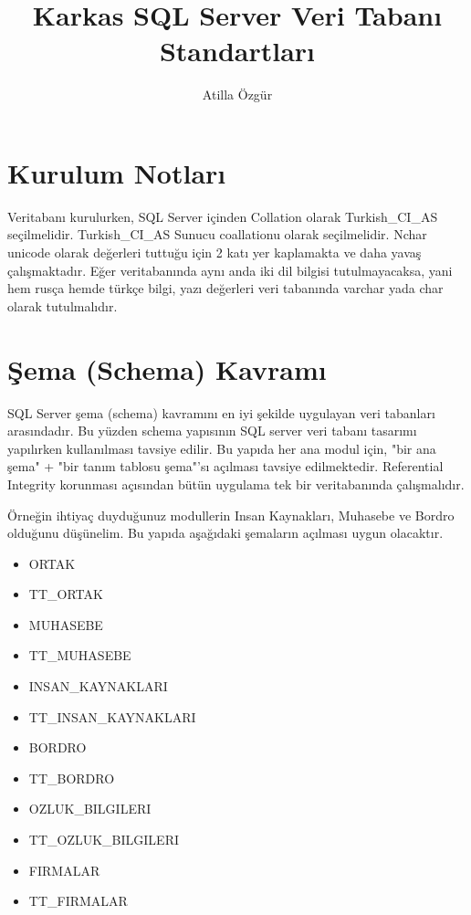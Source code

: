 \documentclass[10pt,a4paper,draft]{article}
\begin{document}
\author{Atilla Özgür}
\title{Karkas SQL Server Veri Tabanı Standartları}

\maketitle

\section{Kurulum Notları}
Veritabanı kurulurken, SQL Server içinden Collation olarak 
Turkish\_CI\_AS seçilmelidir. 
Turkish\_CI\_AS Sunucu coallationu olarak seçilmelidir. 
Nchar unicode olarak değerleri tuttuğu için 2 katı yer kaplamakta 
ve daha yavaş çalışmaktadır. 
Eğer veritabanında aynı anda iki dil bilgisi tutulmayacaksa, 
yani hem rusça hemde türkçe bilgi,
yazı değerleri veri tabanında  varchar yada char olarak tutulmalıdır.


\section{Şema (Schema) Kavramı}


SQL Server şema (schema) kavramını en iyi şekilde uygulayan veri tabanları arasındadır.
Bu yüzden schema yapısının SQL server veri tabanı tasarımı yapılırken kullanılması tavsiye edilir.
Bu yapıda her ana modul için, "bir ana şema" + "bir tanım tablosu şema"'sı açılması tavsiye edilmektedir.
Referential  Integrity korunması açısından bütün uygulama tek bir veritabanında çalışmalıdır.

Örneğin ihtiyaç duyduğunuz modullerin Insan Kaynakları, Muhasebe ve Bordro olduğunu düşünelim. 
Bu yapıda aşağıdaki şemaların açılması uygun olacaktır.

\begin{itemize}
\item ORTAK
\item TT\_ORTAK
\item MUHASEBE
\item TT\_MUHASEBE
\item INSAN\_KAYNAKLARI
\item TT\_INSAN\_KAYNAKLARI
\item BORDRO
\item TT\_BORDRO
\item OZLUK\_BILGILERI
\item TT\_OZLUK\_BILGILERI
\item FIRMALAR
\item TT\_FIRMALAR

\end{itemize}
\end{document}
